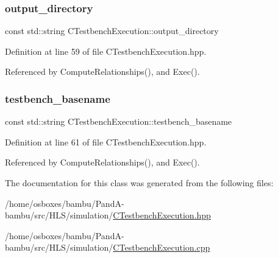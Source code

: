 \subsubsection{\texorpdfstring{output\+\_\+directory}{output\_directory}}
{\footnotesize\ttfamily const std\+::string C\+Testbench\+Execution\+::output\+\_\+directory\hspace{0.3cm}{\ttfamily [protected]}}



Definition at line 59 of file C\+Testbench\+Execution.\+hpp.



Referenced by Compute\+Relationships(), and Exec().

\mbox{\label{classCTestbenchExecution_ab4ede64e226a637b246ff924c69ec629}} 
\subsubsection{\texorpdfstring{testbench\+\_\+basename}{testbench\_basename}}
{\footnotesize\ttfamily const std\+::string C\+Testbench\+Execution\+::testbench\+\_\+basename\hspace{0.3cm}{\ttfamily [protected]}}



Definition at line 61 of file C\+Testbench\+Execution.\+hpp.



Referenced by Compute\+Relationships(), and Exec().



The documentation for this class was generated from the following files\+:\begin{DoxyCompactItemize}
\item 
/home/osboxes/bambu/\+Pand\+A-\/bambu/src/\+H\+L\+S/simulation/\hyperlink{CTestbenchExecution_8hpp}{C\+Testbench\+Execution.\+hpp}\item 
/home/osboxes/bambu/\+Pand\+A-\/bambu/src/\+H\+L\+S/simulation/\hyperlink{CTestbenchExecution_8cpp}{C\+Testbench\+Execution.\+cpp}\end{DoxyCompactItemize}
